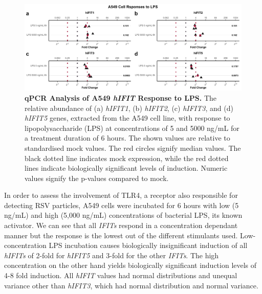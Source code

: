 \begin{figure}
    \centering
    \includegraphics[width=1\linewidth]{06. Chapter 1/Figs/01. Induction/03. a549_treat_lps.pdf}
    \caption[qPCR Analysis of A549 \textit{hIFIT} Response to LPS.]{\textbf{qPCR Analysis of A549 \textit{hIFIT} Response to LPS.} The relative abundance of (a) \textit{hIFIT1}, (b) \textit{hIFIT2}, (c) \textit{hIFIT3}, and (d) \textit{hIFIT5} genes, extracted from the A549 cell line, with response to lipopolysaccharide (LPS) at concentrations of 5 and 5000 ng/mL for a treatment duration of 6 hours. The shown values are relative to standardised mock values. The red circles signify median values. The black dotted line indicates mock expression, while the red dotted lines indicate biologically significant levels of induction. Numeric values signify the p-values compared to mock.}
    \label{A549 Response to LPS}
\end{figure}

In order to assess the involvement of TLR4, a receptor also responsible for detecting RSV particles, A549 cells were incubated for 6 hours with low (5 ng/mL) and high (5,000 ng/mL) concentrations of bacterial LPS, its known activator. We can see that all \textit{IFITs} respond in a concentration dependant manner but the response is the lowest out of the different stimulants used. Low-concentration LPS incubation causes biologically insignificant induction of all \textit{hIFITs} of 2-fold for \textit{hIFIT5} and 3-fold for the other \textit{IFITs}. The high concentration on the other hand yields biologically significant induction levels of 4-8 fold induction. All \textit{hIFIT} values had normal distributions and unequal variance other than \textit{hIFIT3}, which had normal distribution and normal variance.

